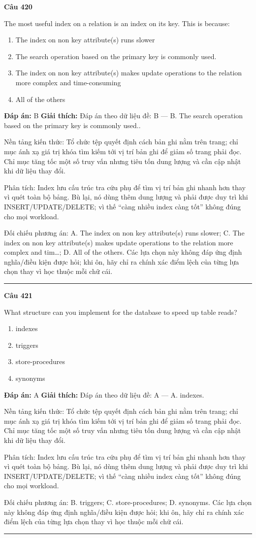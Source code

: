 \documentclass[11pt,a4paper]{article}
\newenvironment{question}[1]{%
  \par\vspace{1em}\noindent\textbf{\large Câu #1}\par\vspace{0.4em}
}{%
  \par\vspace{1em}\hrule\vspace{0.6em}
}
\newenvironment{choices}{%
  \begin{enumerate}[label=\textbf{\Alph*.},leftmargin=2.2em,itemsep=2pt,topsep=3pt]
}{%
  \end{enumerate}
}
\newcommand{\choice}{\item}
\begin{document}
\begin{question}{420}
The most useful index on a relation is an index on its key. This is because:
\begin{choices}
\choice The index on non key attribute(s) runs slower
\choice The search operation based on the primary key is commonly used.
\choice The index on non key attribute(s) makes update operations to the relation more complex and time-consuming
\choice All of the others
\end{choices}
\textbf{Đáp án:} B
\textbf{Giải thích:} Đáp án theo dữ liệu đề: B — B. The search operation based on the primary key is commonly used..

Nền tảng kiến thức: Tổ chức tệp quyết định cách bản ghi nằm trên trang; chỉ mục ánh xạ giá trị khóa tìm kiếm tới vị trí bản ghi để giảm số trang phải đọc. Chỉ mục tăng tốc một số truy vấn nhưng tiêu tốn dung lượng và cần cập nhật khi dữ liệu thay đổi.

Phân tích: Index lưu cấu trúc tra cứu phụ để tìm vị trí bản ghi nhanh hơn thay vì quét toàn bộ bảng. Bù lại, nó dùng thêm dung lượng và phải được duy trì khi INSERT/UPDATE/DELETE; vì thế “càng nhiều index càng tốt” không đúng cho mọi workload.

Đối chiếu phương án: A. The index on non key attribute(s) runs slower; C. The index on non key attribute(s) makes update operations to the relation more complex and tim…; D. All of the others. Các lựa chọn này không đáp ứng định nghĩa/điều kiện được hỏi; khi ôn, hãy chỉ ra chính xác điểm lệch của từng lựa chọn thay vì học thuộc mỗi chữ cái.
\end{question}

\begin{question}{421}
What structure can you implement for the database to speed up table reads?
\begin{choices}
\choice indexes
\choice triggers
\choice store-procedures
\choice synonyms
\end{choices}
\textbf{Đáp án:} A
\textbf{Giải thích:} Đáp án theo dữ liệu đề: A — A. indexes.

Nền tảng kiến thức: Tổ chức tệp quyết định cách bản ghi nằm trên trang; chỉ mục ánh xạ giá trị khóa tìm kiếm tới vị trí bản ghi để giảm số trang phải đọc. Chỉ mục tăng tốc một số truy vấn nhưng tiêu tốn dung lượng và cần cập nhật khi dữ liệu thay đổi.

Phân tích: Index lưu cấu trúc tra cứu phụ để tìm vị trí bản ghi nhanh hơn thay vì quét toàn bộ bảng. Bù lại, nó dùng thêm dung lượng và phải được duy trì khi INSERT/UPDATE/DELETE; vì thế “càng nhiều index càng tốt” không đúng cho mọi workload.

Đối chiếu phương án: B. triggers; C. store-procedures; D. synonyms. Các lựa chọn này không đáp ứng định nghĩa/điều kiện được hỏi; khi ôn, hãy chỉ ra chính xác điểm lệch của từng lựa chọn thay vì học thuộc mỗi chữ cái.
\end{question}
\end{document}
